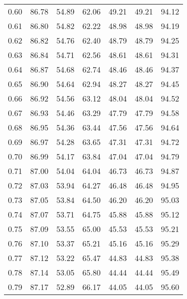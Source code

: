 \begin{tabular}{|c|c|c|c|c|c|c|}
      0.60 &     86.78 &     54.89 &      62.06 &   49.21 &      49.21 &         94.12 \\
      0.61 &     86.80 &     54.82 &      62.22 &   48.98 &      48.98 &         94.19 \\
      0.62 &     86.82 &     54.76 &      62.40 &   48.79 &      48.79 &         94.25 \\
      0.63 &     86.84 &     54.71 &      62.56 &   48.61 &      48.61 &         94.31 \\
      0.64 &     86.87 &     54.68 &      62.74 &   48.46 &      48.46 &         94.37 \\
      0.65 &     86.90 &     54.64 &      62.94 &   48.27 &      48.27 &         94.45 \\
      0.66 &     86.92 &     54.56 &      63.12 &   48.04 &      48.04 &         94.52 \\
      0.67 &     86.93 &     54.46 &      63.29 &   47.79 &      47.79 &         94.58 \\
      0.68 &     86.95 &     54.36 &      63.44 &   47.56 &      47.56 &         94.64 \\
      0.69 &     86.97 &     54.28 &      63.65 &   47.31 &      47.31 &         94.72 \\
      0.70 &     86.99 &     54.17 &      63.84 &   47.04 &      47.04 &         94.79 \\
      0.71 &     87.00 &     54.04 &      64.04 &   46.73 &      46.73 &         94.87 \\
      0.72 &     87.03 &     53.94 &      64.27 &   46.48 &      46.48 &         94.95 \\
      0.73 &     87.05 &     53.84 &      64.50 &   46.20 &      46.20 &         95.03 \\
      0.74 &     87.07 &     53.71 &      64.75 &   45.88 &      45.88 &         95.12 \\
      0.75 &     87.09 &     53.55 &      65.00 &   45.53 &      45.53 &         95.21 \\
      0.76 &     87.10 &     53.37 &      65.21 &   45.16 &      45.16 &         95.29 \\
      0.77 &     87.12 &     53.22 &      65.47 &   44.83 &      44.83 &         95.38 \\
      0.78 &     87.14 &     53.05 &      65.80 &   44.44 &      44.44 &         95.49 \\
      0.79 &     87.17 &     52.89 &      66.17 &   44.05 &      44.05 &         95.60 \\

\end{tabular}
